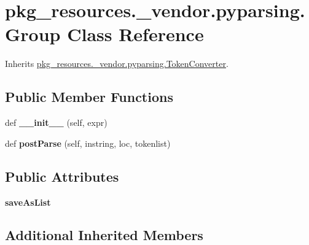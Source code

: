\hypertarget{classpkg__resources_1_1__vendor_1_1pyparsing_1_1_group}{}\section{pkg\+\_\+resources.\+\_\+vendor.\+pyparsing.\+Group Class Reference}
\label{classpkg__resources_1_1__vendor_1_1pyparsing_1_1_group}


Inherits \hyperlink{classpkg__resources_1_1__vendor_1_1pyparsing_1_1_token_converter}{pkg\+\_\+resources.\+\_\+vendor.\+pyparsing.\+Token\+Converter}.

\subsection*{Public Member Functions}
\begin{DoxyCompactItemize}
\item 
\mbox{\label{classpkg__resources_1_1__vendor_1_1pyparsing_1_1_group_a4027ca22a29af1111ae2c7c0194bb330}} 
def {\bfseries \+\_\+\+\_\+init\+\_\+\+\_\+} (self, expr)
\item 
\mbox{\label{classpkg__resources_1_1__vendor_1_1pyparsing_1_1_group_a2fdaf84a40e16b32658acd842a7c8582}} 
def {\bfseries post\+Parse} (self, instring, loc, tokenlist)
\end{DoxyCompactItemize}
\subsection*{Public Attributes}
\begin{DoxyCompactItemize}
\item 
\mbox{\label{classpkg__resources_1_1__vendor_1_1pyparsing_1_1_group_a24b2b05e0aecefa6623eb3ffe38ec492}} 
{\bfseries save\+As\+List}
\end{DoxyCompactItemize}
\subsection*{Additional Inherited Members}


